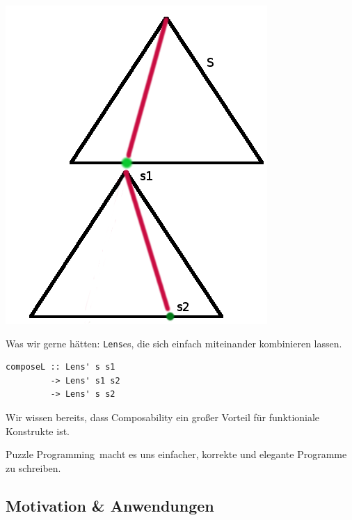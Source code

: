 \documentclass{beamer}
\begin{document}
\begin{frame}[fragile]

\begin{multicols}{2}
\includegraphics[scale=0.4]{lenses_compose.png} 

\columnbreak

Was wir gerne hätten: \texttt{Lens}es, die sich einfach miteinander kombinieren lassen.
\bigskip

\begin{verbatim}
composeL :: Lens' s s1 
         -> Lens' s1 s2
         -> Lens' s s2
\end{verbatim}

Wir wissen bereits, dass Composability ein großer Vorteil für funktioniale Konstrukte ist.\smallskip

\glqq Puzzle Programming\grqq\ macht es uns einfacher, korrekte und elegante Programme zu schreiben.
\end{multicols}
\end{frame}

\subsection{Motivation \& Anwendungen}
\end{document}
